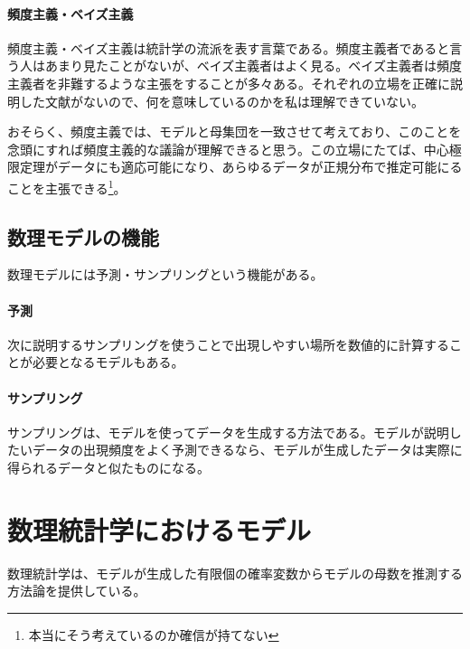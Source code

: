 \begin{mybox}
    \paragraph{頻度主義・ベイズ主義}
    頻度主義・ベイズ主義は統計学の流派を表す言葉である。頻度主義者であると言う人はあまり見たことがないが、ベイズ主義者はよく見る。ベイズ主義者は頻度主義者を非難するような主張をすることが多々ある。それぞれの立場を正確に説明した文献がないので、何を意味しているのかを私は理解できていない。

    おそらく、頻度主義では、モデルと母集団を一致させて考えており、このことを念頭にすれば頻度主義的な議論が理解できると思う。この立場にたてば、中心極限定理がデータにも適応可能になり、あらゆるデータが正規分布で推定可能にることを主張できる\footnote{本当にそう考えているのか確信が持てない}。
\end{mybox}
\fi


\begin{brokenbox}[colback=yellow]
    \blindtext[5]
  \end{brokenbox}
\fi 
\subsection{数理モデルの機能}
数理モデルには予測・サンプリングという機能がある。%
\paragraph{予測}

次に説明するサンプリングを使うことで出現しやすい場所を数値的に計算することが必要となるモデルもある。

\paragraph{サンプリング}
サンプリングは、モデルを使ってデータを生成する方法である。モデルが説明したいデータの出現頻度をよく予測できるなら、モデルが生成したデータは実際に得られるデータと似たものになる。

\section{数理統計学におけるモデル}
数理統計学は、モデルが生成した有限個の確率変数からモデルの母数を推測する方法論を提供している。



